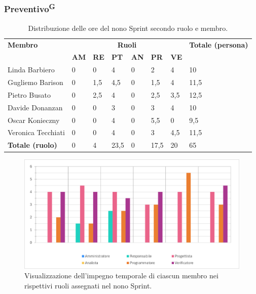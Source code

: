 \documentclass[8pt]{article}
\newcommand{\glossterm}[1]{#1\textsuperscript{G}} %
\begin{document}
\subsubsection{\glossterm{Preventivo}}\begin{table}[ht!]
	\centering
	\begin{tabular}{p{4cm} p{1cm} p{1cm} p{1cm} p{1cm} p{1cm} p{1cm} p{3cm}}
		\toprule
        \textbf{Membro} & \multicolumn{6}{c}{\textbf{Ruoli}} & \textbf{Totale (persona)}\\
		& \textbf{AM} & \textbf{RE} & \textbf{PT} & \textbf{AN} & \textbf{PR} & \textbf{VE}\\
		\midrule
        Linda Barbiero & 0 & 0 & 4 & 0 & 2 & 4 & 10 \\ 
        Gugliemo Barison & 0 & 1,5 & 4,5 & 0 & 1,5 & 4 & 11,5 \\ 
        Pietro Busato & 0 & 2,5 & 4 & 0 & 2,5 & 3,5 & 12,5 \\ 
        Davide Donanzan & 0 & 0 & 3 & 0 & 3 & 4 & 10 \\ 
        Oscar Konieczny & 0 & 0 & 4 & 0 & 5,5 & 0 & 9,5 \\ 
        Veronica Tecchiati & 0 & 0 & 4 & 0 & 3 & 4,5 & 11,5 \\
        \midrule
        \textbf{Totale (ruolo)} & 0 & 4 & 23,5 & 0 & 17,5 & 20 & 65 \\ 
	\bottomrule
	\end{tabular}
	\caption{Distribuzione delle ore del nono Sprint secondo ruolo e membro.}
	\label{table:Distribuzione delle ore del nono Sprint secondo ruolo e membro}
\end{table}
\begin{figure}[ht!]
    \centering
    \includegraphics[width=15cm]{./images_pdp/istogramma_periodo_9.png}
    \caption{Visualizzazione dell'impegno temporale di ciascun membro nei rispettivi ruoli assegnati
    nel nono Sprint.}
    \label{figure:Visualizzazione dell'impegno temporale di ciascun membro nei rispettivi ruoli
    assegnati nel nono Sprint}
\end{figure}
\end{document}
